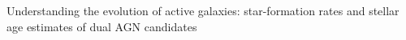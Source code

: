 Understanding the evolution of active galaxies: star-formation rates and stellar age estimates of dual AGN candidates
  
  
  